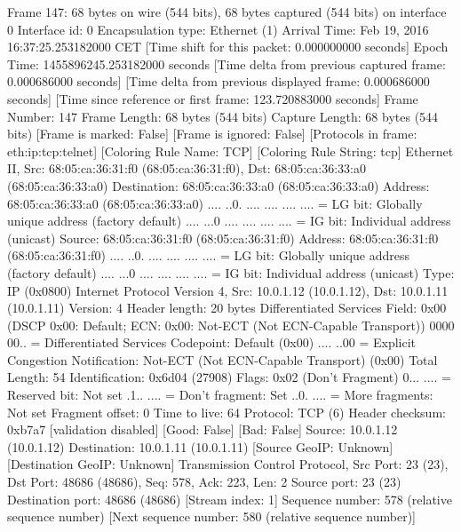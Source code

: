 Frame 147: 68 bytes on wire (544 bits), 68 bytes captured (544 bits) on interface 0
    Interface id: 0
    Encapsulation type: Ethernet (1)
    Arrival Time: Feb 19, 2016 16:37:25.253182000 CET
    [Time shift for this packet: 0.000000000 seconds]
    Epoch Time: 1455896245.253182000 seconds
    [Time delta from previous captured frame: 0.000686000 seconds]
    [Time delta from previous displayed frame: 0.000686000 seconds]
    [Time since reference or first frame: 123.720883000 seconds]
    Frame Number: 147
    Frame Length: 68 bytes (544 bits)
    Capture Length: 68 bytes (544 bits)
    [Frame is marked: False]
    [Frame is ignored: False]
    [Protocols in frame: eth:ip:tcp:telnet]
    [Coloring Rule Name: TCP]
    [Coloring Rule String: tcp]
Ethernet II, Src: 68:05:ca:36:31:f0 (68:05:ca:36:31:f0), Dst: 68:05:ca:36:33:a0 (68:05:ca:36:33:a0)
    Destination: 68:05:ca:36:33:a0 (68:05:ca:36:33:a0)
        Address: 68:05:ca:36:33:a0 (68:05:ca:36:33:a0)
        .... ..0. .... .... .... .... = LG bit: Globally unique address (factory default)
        .... ...0 .... .... .... .... = IG bit: Individual address (unicast)
    Source: 68:05:ca:36:31:f0 (68:05:ca:36:31:f0)
        Address: 68:05:ca:36:31:f0 (68:05:ca:36:31:f0)
        .... ..0. .... .... .... .... = LG bit: Globally unique address (factory default)
        .... ...0 .... .... .... .... = IG bit: Individual address (unicast)
    Type: IP (0x0800)
Internet Protocol Version 4, Src: 10.0.1.12 (10.0.1.12), Dst: 10.0.1.11 (10.0.1.11)
    Version: 4
    Header length: 20 bytes
    Differentiated Services Field: 0x00 (DSCP 0x00: Default; ECN: 0x00: Not-ECT (Not ECN-Capable Transport))
        0000 00.. = Differentiated Services Codepoint: Default (0x00)
        .... ..00 = Explicit Congestion Notification: Not-ECT (Not ECN-Capable Transport) (0x00)
    Total Length: 54
    Identification: 0x6d04 (27908)
    Flags: 0x02 (Don't Fragment)
        0... .... = Reserved bit: Not set
        .1.. .... = Don't fragment: Set
        ..0. .... = More fragments: Not set
    Fragment offset: 0
    Time to live: 64
    Protocol: TCP (6)
    Header checksum: 0xb7a7 [validation disabled]
        [Good: False]
        [Bad: False]
    Source: 10.0.1.12 (10.0.1.12)
    Destination: 10.0.1.11 (10.0.1.11)
    [Source GeoIP: Unknown]
    [Destination GeoIP: Unknown]
Transmission Control Protocol, Src Port: 23 (23), Dst Port: 48686 (48686), Seq: 578, Ack: 223, Len: 2
    Source port: 23 (23)
    Destination port: 48686 (48686)
    [Stream index: 1]
    Sequence number: 578    (relative sequence number)
    [Next sequence number: 580    (relative sequence number)]
